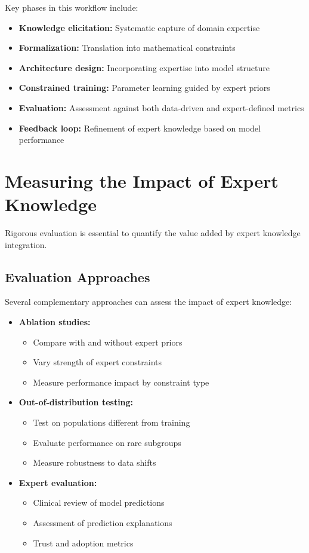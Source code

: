 Key phases in this workflow include:
\begin{itemize}
    \item \textbf{Knowledge elicitation:} Systematic capture of domain expertise
    \item \textbf{Formalization:} Translation into mathematical constraints
    \item \textbf{Architecture design:} Incorporating expertise into model structure
    \item \textbf{Constrained training:} Parameter learning guided by expert priors
    \item \textbf{Evaluation:} Assessment against both data-driven and expert-defined metrics
    \item \textbf{Feedback loop:} Refinement of expert knowledge based on model performance
\end{itemize}

\section{Measuring the Impact of Expert Knowledge}

Rigorous evaluation is essential to quantify the value added by expert knowledge integration.

\subsection{Evaluation Approaches}

Several complementary approaches can assess the impact of expert knowledge:

\begin{itemize}
    \item \textbf{Ablation studies:}
    \begin{itemize}
        \item Compare with and without expert priors
        \item Vary strength of expert constraints
        \item Measure performance impact by constraint type
    \end{itemize}

    \item \textbf{Out-of-distribution testing:}
    \begin{itemize}
        \item Test on populations different from training
        \item Evaluate performance on rare subgroups
        \item Measure robustness to data shifts
    \end{itemize}

    \item \textbf{Expert evaluation:}
    \begin{itemize}
        \item Clinical review of model predictions
        \item Assessment of prediction explanations
        \item Trust and adoption metrics
    \end{itemize}
\end{itemize}

